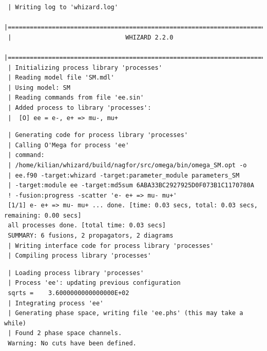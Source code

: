 \documentclass[12pt]{book}
\begin{document}
 \begin{footnotesize}
 \begin{verbatim}
 | Writing log to 'whizard.log'
 |=============================================================================|
 |                               WHIZARD 2.2.0
 |=============================================================================|
 | Initializing process library 'processes'
 | Reading model file 'SM.mdl'
 | Using model: SM
 | Reading commands from file 'ee.sin'
 | Added process to library 'processes':
 |  [O] ee = e-, e+ => mu-, mu+
 \end{verbatim}

 \begin{verbatim}
 | Generating code for process library 'processes'
 | Calling O'Mega for process 'ee'
 | command:
 | /home/kilian/whizard/build/nagfor/src/omega/bin/omega_SM.opt -o
 | ee.f90 -target:whizard -target:parameter_module parameters_SM
 | -target:module ee -target:md5sum 6ABA33BC2927925D0F073B1C1170780A 
 ! -fusion:progress -scatter 'e- e+ => mu- mu+'
 [1/1] e- e+ => mu- mu+ ... done. [time: 0.03 secs, total: 0.03 secs, remaining: 0.00 secs]
 all processes done. [total time: 0.03 secs]
 SUMMARY: 6 fusions, 2 propagators, 2 diagrams
 | Writing interface code for process library 'processes'
 | Compiling process library 'processes'
 \end{verbatim}


 \begin{verbatim}
 | Loading process library 'processes'
 | Process 'ee': updating previous configuration
 sqrts =    3.6000000000000000E+02
 | Integrating process 'ee'
 | Generating phase space, writing file 'ee.phs' (this may take a while)
 | Found 2 phase space channels.
 Warning: No cuts have been defined.
 \end{verbatim}



\end{footnotesize}
\end{document}
